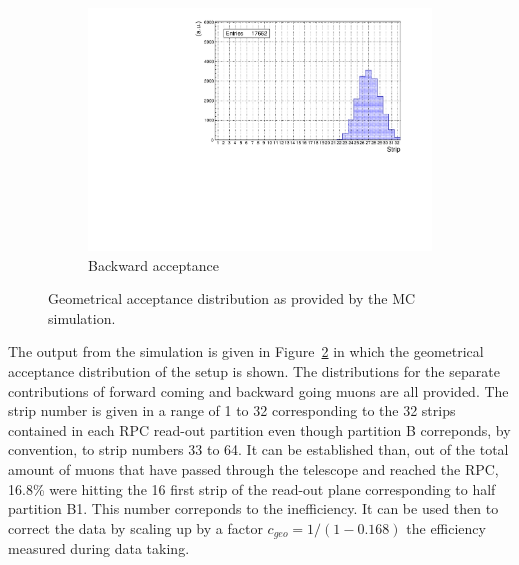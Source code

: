 \begin{figure}
\begin{subfigure}{\linewidth}
			\includegraphics[width = \linewidth]{fig/chapt5/Geometrical-acceptance-backward.pdf}
			\caption{\label{fig:SimResult:C} Backward acceptance}
		\end{subfigure}
		\caption{\label{fig:SimResult} Geometrical acceptance distribution as provided by the \acl{MC} simulation.}
	\end{figure}
	
	The output from the simulation is given in Figure~\ref{fig:SimResult} in which the geometrical acceptance distribution of the setup is shown. The distributions for the separate contributions of forward coming and backward going muons are all provided. The strip number is given in a range of 1 to 32 corresponding to the 32 strips contained in each RPC read-out partition even though partition B correponds, by convention, to strip numbers 33 to 64. It can be established than, out of the total amount of muons that have passed through the telescope and reached the RPC, 16.8\% were hitting the 16 first strip of the read-out plane corresponding to half partition B1. This number correponds to the inefficiency. It can be used then to correct the data by scaling up by a factor $c_{geo} = 1/(1-0.168)$ the efficiency measured during data taking.
	

